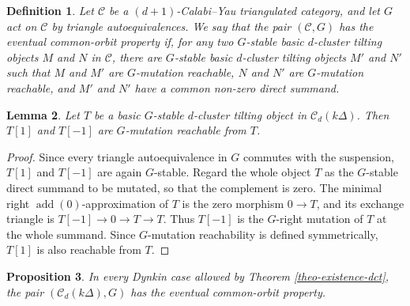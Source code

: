 \documentclass[12pt]{article}
\theoremstyle{plain}
\newtheorem{Def}{Definition}[section]
\newtheorem{Prop}[Def]{Proposition}
\newtheorem{Lem}[Def]{Lemma}
\theoremstyle{definition}
\DeclareMathOperator{\add}{add}
\begin{document}
\begin{Def}\label{def-eventual-common-orbit}
Let \(\mathcal C\) be a \((d+1)\)-Calabi--Yau triangulated category, and let
\(G\) act on \(\mathcal C\) by triangle autoequivalences.  We say that the
pair \((\mathcal C,G)\) has the
\emph{eventual common-orbit property} if, for any two \(G\)-stable basic
\(d\)-cluster tilting objects \(M\) and \(N\) in \(\mathcal C\), there are
\(G\)-stable basic \(d\)-cluster tilting objects \(M'\) and \(N'\) such that
\(M\) and \(M'\) are \(G\)-mutation reachable, \(N\) and \(N'\) are
\(G\)-mutation reachable, and \(M'\) and \(N'\) have a common non-zero direct
summand. 
\end{Def}

\begin{Lem}\label{lem-shift-whole-mutation}
Let \(T\) be a basic \(G\)-stable \(d\)-cluster tilting object in
\(\mathcal C_d(k\Delta)\).  Then \(T[1]\) and \(T[-1]\) are
\(G\)-mutation reachable from \(T\).
\end{Lem}

\begin{proof}
Since every triangle autoequivalence in \(G\) commutes with the suspension,
\(T[1]\) and \(T[-1]\) are again \(G\)-stable.  Regard the whole object
\(T\) as the \(G\)-stable direct summand to be mutated, so that the
complement is zero.  The minimal right \(\add(0)\)-approximation of \(T\) is
the zero morphism \(0\to T\), and its exchange triangle is
\(T[-1]\longrightarrow 0\longrightarrow T\longrightarrow T.\)
Thus \(T[-1]\) is the \(G\)-right mutation of \(T\) at the whole summand.
Since \(G\)-mutation reachability is defined symmetrically, \(T[1]\) is also
reachable from \(T\).
\end{proof}

\begin{Prop}\label{prop-eventual-common-orbit-ADE}
In every Dynkin case allowed by Theorem \ref{theo-existence-dct}, the pair
\((\mathcal C_d(k\Delta),G)\) has the eventual common-orbit property.
\end{Prop}
\end{document}
